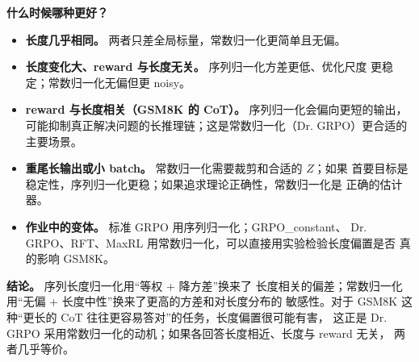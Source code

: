 \documentclass[UTF8,fontset=none,11pt,a4paper]{ctexart}
\begin{document}
\begin{answerbox}
\textcolor{deepgreen}{\textbf{什么时候哪种更好？}}
\begin{itemize}
  \item \textbf{长度几乎相同。} 两者只差全局标量，常数归一化更简单且无偏。
  \item \textbf{长度变化大、reward 与长度无关。} 序列归一化方差更低、优化尺度
        更稳定；常数归一化无偏但更 noisy。
  \item \textbf{reward 与长度相关（GSM8K 的 CoT）。} 序列归一化会偏向更短的输出，
        可能抑制真正解决问题的长推理链；这是常数归一化（Dr. GRPO）更合适的
        主要场景。
  \item \textbf{重尾长输出或小 batch。} 常数归一化需要裁剪和合适的 \(Z\)；如果
        首要目标是稳定性，序列归一化更稳；如果追求理论正确性，常数归一化是
        正确的估计器。
  \item \textbf{作业中的变体。} 标准 GRPO 用序列归一化；GRPO\_constant、
        Dr. GRPO、RFT、MaxRL 用常数归一化，可以直接用实验检验长度偏置是否
        真的影响 GSM8K。
\end{itemize}
\end{answerbox}

\textcolor{deepgreen}{\textbf{结论。}} 序列长度归一化用“等权 + 降方差”换来了
长度相关的偏差；常数归一化用“无偏 + 长度中性”换来了更高的方差和对长度分布的
敏感性。对于 GSM8K 这种“更长的 CoT 往往更容易答对”的任务，长度偏置很可能有害，
这正是 Dr. GRPO 采用常数归一化的动机；如果各回答长度相近、长度与 reward 无关，
两者几乎等价。
\end{document}
